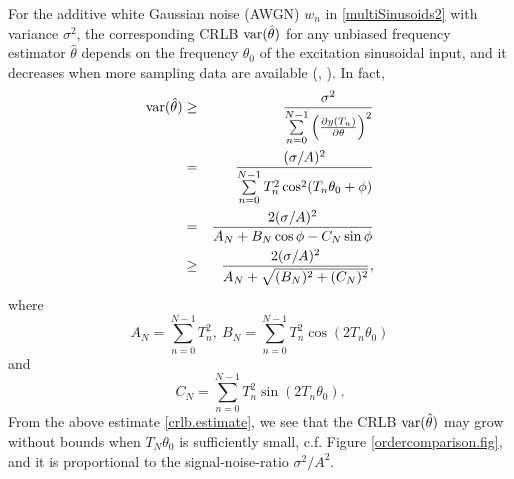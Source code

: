 \documentclass{UCF_ETD}
\begin{document}


For the additive white Gaussian noise (AWGN) $w_n$ in \eqref{multiSinusoids2}   with variance $\sigma ^2$,
the corresponding CRLB ${\rm var}(\hat{\theta})$ for any unbiased frequency estimator $\hat \theta$
depends on
the frequency $\theta_0$ of the excitation sinusoidal input,
and   it decreases when
more sampling data are available (\cite{kay81}, \cite{kay13}).
In fact, %
 \begin{eqnarray}\label{crlb.estimate}
{\rm var}(\hat{\theta})  & \geq &
\frac{\sigma ^2}{\sum\limits_{n=0}^{N-1}\Big(\frac{\partial y(T_n)}{\partial \theta}\Big)^2 }\nonumber\\
& = & \frac{(\sigma/A)^2}{\sum\limits_{n=0}^{N-1} T_n^2  \cos^2 (T_n \theta_0  + \phi ) }\nonumber\\
 & = &
 \frac{2 (\sigma/A)^2}{A_N +   B_N \cos \phi- C_N \sin \phi
  }\nonumber\\
  & \ge &
 \frac{2 (\sigma/A)^2}{A_N + \sqrt{(B_N)^2+(C_N)^2} },
%
 \end{eqnarray}
 where
 $$A_N=\sum\limits_{n=0}^{N-1} T_n^2,\  B_N=\sum_{n=0}^{N-1} T_n^2 \cos (2T_n\theta_0)$$
  and
  $$C_N=\sum_{n=0}^{N-1} T_n^2 \sin (2T_n\theta_0).$$
 From  the above estimate \eqref{crlb.estimate}, we see that
the CRLB ${\rm var}(\hat{\theta})$
may grow without bounds when $T_N \theta_0$ is sufficiently small, c.f. Figure \ref{ordercomparison.fig},
and  it  is proportional to the signal-noise-ratio $\sigma^2/A^2$.
\end{document}

